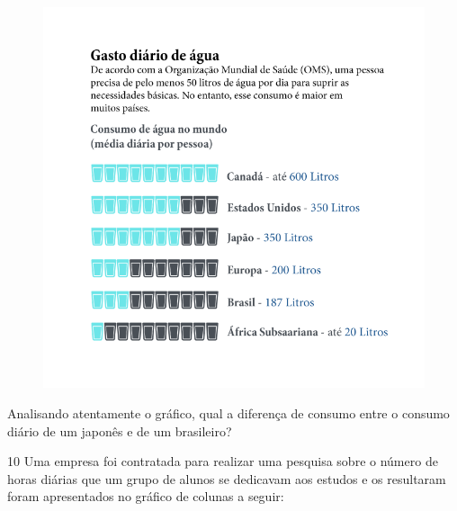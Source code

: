 \begin{figure}[htpb!]
\includegraphics[width=\textwidth]{../ilustracoes/MAT5/SAEB_5ANO_MAT_figura108.png}
\end{figure}

Analisando atentamente o gráfico, qual a diferença de consumo entre o
consumo diário de um japonês e de um brasileiro?



\num{10} Uma empresa foi contratada para realizar uma pesquisa sobre o
número de horas diárias que um grupo de alunos se dedicavam aos estudos
e os resultaram foram apresentados no gráfico de colunas a seguir:

